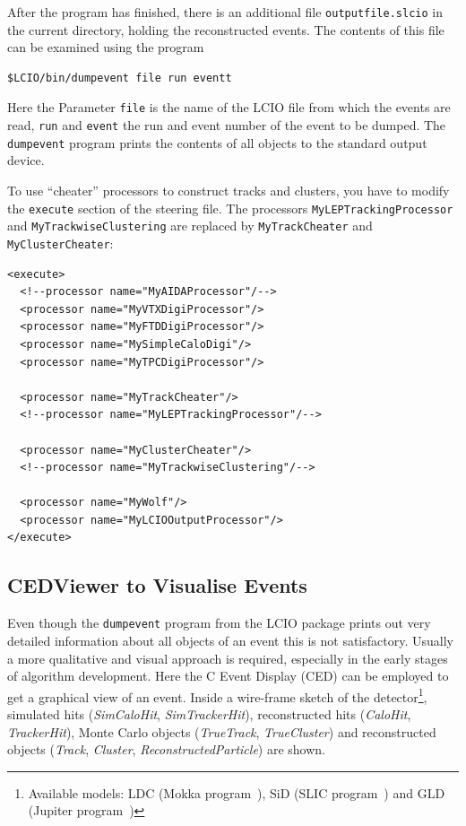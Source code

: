 After the program has finished, there is an additional file 
{\tt outputfile.slcio} in the current directory, holding the reconstructed 
events. The contents of this file can be examined using the program

\begin{verbatim}
$LCIO/bin/dumpevent file run eventt
\end{verbatim}

Here the Parameter {\tt file} is the name of the LCIO file from which the 
events are read,
{\tt run} and {\tt event} the run and event number of the event to be dumped.
The {\tt dumpevent} program prints the contents of all objects to 
the standard output device.  

To use ``cheater'' processors to construct tracks and clusters,
you have to modify the {\tt execute} section of the steering file. 
The processors {\tt MyLEPTrackingProcessor} and {\tt MyTrackwiseClustering}
are replaced by {\tt MyTrackCheater} and {\tt MyClusterCheater}:

\begin{verbatim}
<execute>
  <!--processor name="MyAIDAProcessor"/-->
  <processor name="MyVTXDigiProcessor"/>
  <processor name="MyFTDDigiProcessor"/>
  <processor name="MySimpleCaloDigi"/>
  <processor name="MyTPCDigiProcessor"/>

  <processor name="MyTrackCheater"/>
  <!--processor name="MyLEPTrackingProcessor"/-->

  <processor name="MyClusterCheater"/>
  <!--processor name="MyTrackwiseClustering"/-->

  <processor name="MyWolf"/>
  <processor name="MyLCIOOutputProcessor"/>
</execute>
\end{verbatim}

\subsection{CEDViewer to Visualise Events}

Even though the {\tt dumpevent} program from the LCIO package prints out
very detailed information about all objects of an event
this is not satisfactory. Usually a more qualitative and 
visual approach is required, especially in the early 
stages of algorithm development. Here the C Event Display (CED) can be 
employed to get a graphical view of an event. Inside a 
wire-frame sketch of the detector\footnote{
      Available models: LDC (Mokka program~\cite{ref_mokka}), 
      SiD (SLIC program~\cite{ref_slic}) and 
      GLD (Jupiter program~\cite{ref_jupiter})}, 
simulated hits ({\em SimCaloHit}, {\em SimTrackerHit}), reconstructed hits 
({\em CaloHit}, {\em TrackerHit}), Monte Carlo objects 
({\em TrueTrack}, {\em TrueCluster}) and reconstructed objects 
({\em Track}, {\em Cluster}, {\em ReconstructedParticle}) are shown. 


